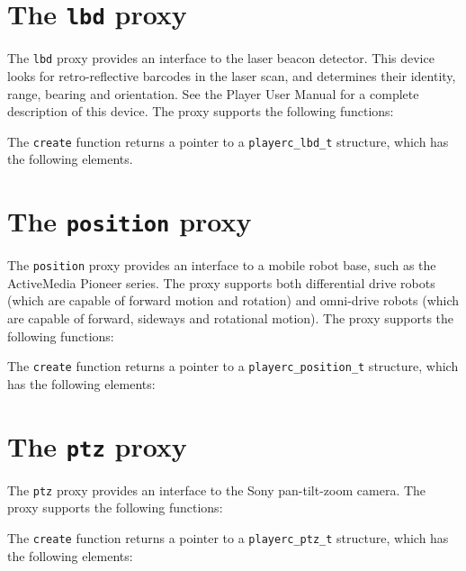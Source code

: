 \documentclass[11pt]{report}
\begin{document}
\newpage
\section{The {\tt lbd} proxy}

The {\tt lbd} proxy provides an interface to the laser beacon
detector.  This device looks for retro-reflective barcodes in the
laser scan, and determines their identity, range, bearing and
orientation.  See the Player User Manual for a complete description of
this device.  The proxy supports the following functions:
\begin{quote}

\end{quote}
The {\tt create} function returns a pointer to a {\tt playerc\_lbd\_t}
structure, which has the following elements.
\begin{quote}

\end{quote}


\newpage
\section{The {\tt position} proxy}

The {\tt position} proxy provides an interface to a mobile robot base,
such as the ActiveMedia Pioneer series.  The proxy supports both
differential drive robots (which are capable of forward motion and
rotation) and omni-drive robots (which are capable of forward,
sideways and rotational motion).  The proxy supports the following
functions:
\begin{quote}

\end{quote}
The {\tt create} function returns a pointer to a {\tt playerc\_position\_t}
structure, which has the following elements:
\begin{quote}

\end{quote}


\newpage
\section{The {\tt ptz} proxy}

The {\tt ptz} proxy provides an interface to the Sony pan-tilt-zoom
camera.  The proxy supports the following
functions:
\begin{quote}

\end{quote}
The {\tt create} function returns a pointer to a {\tt playerc\_ptz\_t}
structure, which has the following elements:
\begin{quote}

\end{quote}
\end{document}
